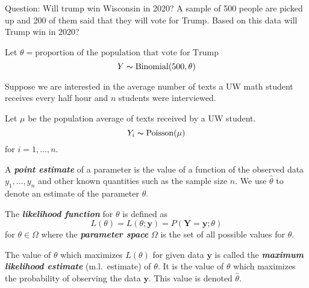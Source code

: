 \begin{exbox}
    \begin{example}
        Question: Will trump win Wisconsin in 2020? A sample of 500 people
        are picked up and 200 of them said that they will vote for Trump. Based
        on this data will Trump win in 2020?
        
        Let $ \theta=\text{proportion of the population that vote for Trump} $
        \[ Y \thicksim \operatorname{Binomial}(500,\theta) \]
    \end{example}
\end{exbox}

\begin{exbox}
    \begin{example}
        Suppose we are interested in the average number of texts a UW math student
        receives every half hour and $ n $ students were interviewed.
        
        Let $ \mu $ be the population average of texts received by a UW student.
        \[ Y_i \thicksim \operatorname{Poisson}(\mu) \]
        for $ i=1,\ldots ,n $.
    \end{example}
\end{exbox}

\begin{defbox}
    \begin{definition}
        A \textbf{\emph{point estimate}} of a parameter is the value of a function
        of the observed data $ y_1,\ldots ,y_n $ and other known quantities such as
        the sample size $ n $. We use $ \hat{\theta} $ to denote an estimate
        of the parameter $ \theta $.
    \end{definition}
\end{defbox}

\begin{defbox}
    \begin{definition}
        The \textbf{\emph{likelihood function}} for $ \theta $ is defined as
        \[ L(\theta)=L(\theta;\bm{y})=P(\bm{Y}=\bm{y}; \theta) \]
        for $ \theta\in\Omega $ where the \textbf{\emph{parameter space}} $ \Omega $
        is the set of all possible values for $ \theta $.
    \end{definition}
\end{defbox}

\begin{defbox}
    \begin{definition}
        The value of $ \theta $ which maximizes $ L(\theta) $ for given data $ \bm{y} $
        is called the \textbf{\emph{maximum likelihood estimate}} (m.l.\ estimate) of $ \theta $.
        It is the value of $ \theta $ which maximizes the probability of observing the data
        $ \bm{y} $. This value is denoted $ \hat{\theta} $.
    \end{definition}
\end{defbox}

